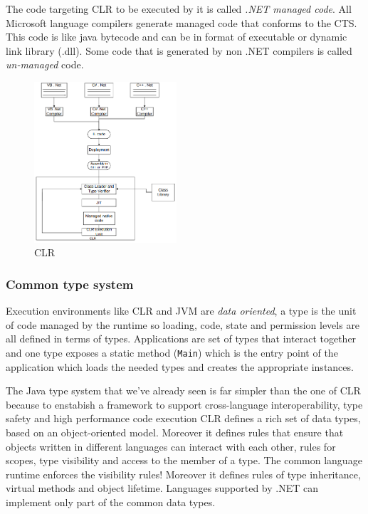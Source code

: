 The code targeting CLR to be executed by it is called \emph{.NET managed code}.
All Microsoft language compilers generate managed code that conforms to the CTS.
This code is like java bytecode and can be in format of executable or dynamic link library (.dll).
Some code that is generated by non .NET compilers is called \emph{un-managed} code.
\begin{figure}[H]
    \centering
    \includegraphics[width=200px]{images/3_Software_Components/CLR.png}
    \caption{CLR}
\end{figure}

\subsubsection{Common type system}
Execution environments like CLR and JVM are \emph{data oriented}, a type is the unit of code managed by the runtime so loading, code, state and permission levels are all defined in terms of types.
Applications are set of types that interact together and one type exposes a static method (\verb|Main|) which is the entry point of the application which loads the needed types and creates the appropriate instances.

The Java type system that we've already seen is far simpler than the one of CLR because to enstabish a framework to support cross-language interoperability, type safety and high performance code execution CLR defines a rich set of data types, based on an object-oriented model.
Moreover it defines rules that ensure that objects written in different languages can interact with each other, rules for scopes, type visibility and access to the member of a type.
The common language runtime enforces the visibility rules!
Moreover it defines rules of type inheritance, virtual methods and object lifetime.
Languages supported by .NET can implement only part of the common data types.

